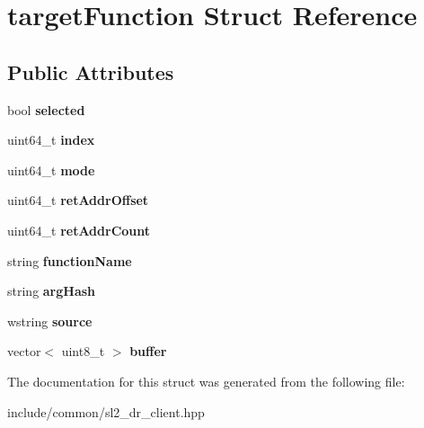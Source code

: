 \hypertarget{structtarget_function}{}\section{target\+Function Struct Reference}
\label{structtarget_function}
\subsection*{Public Attributes}
\begin{DoxyCompactItemize}
\item 
\mbox{\label{structtarget_function_a678fa11617fec43c6da4e0e6b9818457}} 
bool {\bfseries selected}
\item 
\mbox{\label{structtarget_function_a367d7fd43c5901084d6b8a5741866b41}} 
uint64\+\_\+t {\bfseries index}
\item 
\mbox{\label{structtarget_function_a1fcd59c7d3b0f2119d9420bc3f8e7aac}} 
uint64\+\_\+t {\bfseries mode}
\item 
\mbox{\label{structtarget_function_ab11ce46746341233060642c1c7651e41}} 
uint64\+\_\+t {\bfseries ret\+Addr\+Offset}
\item 
\mbox{\label{structtarget_function_abf3d060260949bae8ce22c8695be590b}} 
uint64\+\_\+t {\bfseries ret\+Addr\+Count}
\item 
\mbox{\label{structtarget_function_a63d3736b24a4cc15bfefb223ee9cbeca}} 
string {\bfseries function\+Name}
\item 
\mbox{\label{structtarget_function_a67271142ac3b154a0dd2aac6544be849}} 
string {\bfseries arg\+Hash}
\item 
\mbox{\label{structtarget_function_afcf4dd87ccb8f3fdc042986674673370}} 
wstring {\bfseries source}
\item 
\mbox{\label{structtarget_function_a1a22c6fddea4d1423ff856184bbb27e5}} 
vector$<$ uint8\+\_\+t $>$ {\bfseries buffer}
\end{DoxyCompactItemize}


The documentation for this struct was generated from the following file\+:\begin{DoxyCompactItemize}
\item 
include/common/sl2\+\_\+dr\+\_\+client.\+hpp\end{DoxyCompactItemize}
